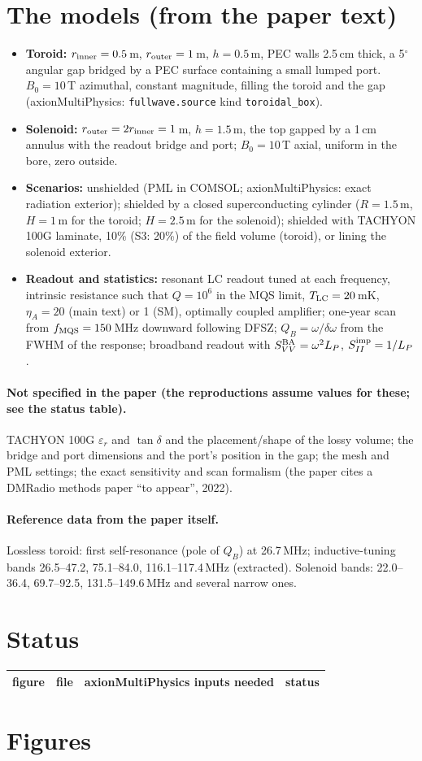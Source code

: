 \documentclass[11pt]{article}
\begin{document}
\section{The models (from the paper text)}
\begin{itemize}
\item \textbf{Toroid:} $r_{\rm inner}=0.5$\,m, $r_{\rm outer}=1$\,m, $h=0.5$\,m, PEC walls 2.5\,cm thick, a
5$^\circ$ angular gap bridged by a PEC surface containing a small lumped port. $B_0=10$\,T azimuthal, constant
magnitude, filling the toroid and the gap (axionMultiPhysics: \texttt{fullwave.source} kind \texttt{toroidal\_box}).
\item \textbf{Solenoid:} $r_{\rm outer}=2r_{\rm inner}=1$\,m, $h=1.5$\,m, the top gapped by a 1\,cm annulus with the
readout bridge and port; $B_0=10$\,T axial, uniform in the bore, zero outside.
\item \textbf{Scenarios:} unshielded (PML in COMSOL; axionMultiPhysics: exact radiation exterior); shielded by a closed
superconducting cylinder ($R=1.5$\,m, $H=1$\,m for the toroid; $H=2.5$\,m for the solenoid); shielded with
TACHYON 100G laminate, 10\% (S3: 20\%) of the field volume (toroid), or lining the solenoid exterior.
\item \textbf{Readout and statistics:} resonant LC readout tuned at each frequency, intrinsic resistance such that
$Q=10^6$ in the MQS limit, $T_{\rm LC}=20$\,mK, $\eta_A = 20$ (main text) or 1 (SM), optimally coupled amplifier;
one-year scan from $f_{\rm MQS}=150$\,MHz downward following DFSZ; $Q_B=\omega/\delta\omega$ from the FWHM of the
response; broadband readout with $S_{VV}^{\rm BA}=\omega^2L_P$, $S_{II}^{\rm imp}=1/L_P$.
\end{itemize}

\paragraph{Not specified in the paper (the reproductions assume values for these; see the status table).}
TACHYON 100G $\varepsilon_r$ and $\tan\delta$ and the placement/shape of the lossy volume; the bridge and port
dimensions and the port's position in the gap; the mesh and PML settings; the exact sensitivity and scan formalism
(the paper cites a DMRadio methods paper ``to appear'', 2022).

\paragraph{Reference data from the paper itself.} Lossless toroid: first self-resonance (pole of $Q_B$) at
26.7\,MHz; inductive-tuning bands 26.5--47.2, 75.1--84.0, 116.1--117.4\,MHz (extracted). Solenoid bands:
22.0--36.4, 69.7--92.5, 131.5--149.6\,MHz and several narrow ones.

\section{Status}
\begin{longtable}{p{2.2cm}p{4.6cm}p{6.6cm}p{2cm}}
\toprule figure & file & axionMultiPhysics inputs needed & status\\\midrule
\bottomrule\end{longtable}

\clearpage

\section{Figures}
\end{document}
